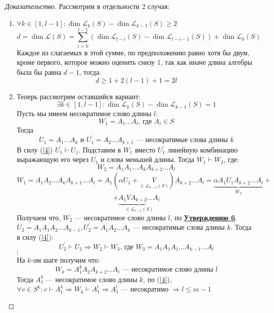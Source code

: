 \documentclass[a4paper, 14pt]{extarticle}
\theoremstyle{definition}
\begin{document}
\begin{proof}[Доказательство]
	Рассмотрим в отдельности 2 случая:
	\begin{enumerate}
		\item \(\forall k \in [1, l - 1] : \operatorname{dim} \mathcal{L}_k(S) - \operatorname{dim} \mathcal{L}_{k - 1}(S) \geqslant 2\)
		\[d = \operatorname{dim} \mathcal{L}(S) = \sum\limits_{i = 0}^{l - 1} \left(\operatorname{dim} \mathcal{L}_{l - i}(S) - \operatorname{dim} \mathcal{L}_{l - i - 1}(S) \right) + \operatorname{dim} \mathcal{L}_{0}(S)\]
		Каждое из слагаемых в этой сумме, по предположению равно хотя бы двум, кроме первого, которое можно оценить снизу 1, так как иначе длина алгебры была бы равна \(d - 1\), тогда:
		\[d \geqslant 1 + 2(l - 1) + 1 = 2l\]
		
		\item Теперь рассмотрим оставшийся вариант:
		\[\exists k \in [1, l - 1] : \operatorname{dim} \mathcal{L}_k(S) - \operatorname{dim} \mathcal{L}_{k - 1}(S) = 1 \label{4}\tag{4}\]
		Пусть мы имеем несократимое слово длины \(l\):
		\[W_1 = A_1 \dots A_l \text{, где } A_i \in S\]
		Тогда
		\[U_1 = A_1 \dots A_k \text{ и } U^{\prime}_1 = A_2 \dots A_{k + 1} \text{ --- несократимые слова длины } k\]
		В силу (\ref{4}) \(U_1^{\prime} \vdash U_1\). Подставим в \(W_1\) вместо \(U_1^{\prime}\) линейную комбинацию выражающую его через \(U_1\) и слова меньшей длины. Тогда \(W_1 \vdash W_2\), где:
		\[W_2 = A_1A_1 \dots A_k A_{k + 2} \dots A_l\]
		\[W_1 = A_1A_2 \dots A_{k}A_{k + 1} \dots A_l = A_1 (\alpha U_1 + \underset{\in \mathcal{L}_{k - 1}(S)}{V})A_{k + 2} \dots A_l = \underbrace{\alpha A_1 U_1 A_{k + 2} \dots A_l}_{W_2} +\]
		\[+ \underbrace{A_1 V A_{k + 2} \dots A_{l}}_{\in \mathcal{L}_{l - 1}(S)}\]
		Получаем что, \(W_2\) --- несократимое слово длины \(l\), по \hyperref[st7_2]{\textbf{Утверждению 6}}.\\
		\(U_2 = A_1A_1A_2 \dots A_{k - 1}, U_2^{\prime} = A_1A_2 \dots A_{k}\) --- несократимые слова длины \(k\). Тогда в силу (\ref{4}):
		\[U_2^{\prime} \vdash U_2 \Rightarrow W_2 \vdash W_3 \text{, где } W_3 = A_1A_1A_1 \dots A_{k - 1} \dots A_{l}\]
		\(\vdots\)\\
		На \(k\)-ом шаге получим что:
		\[W_k = A_1^k A_2 A_{k + 2} \dots A_l \text{ --- несократимое слово длины } l\]
		Тогда \(A_1^k\) --- несократимое слово длины \(k\), по (\ref{4}), \(\forall v \in S^k : v \vdash A_1^k \Rightarrow W_k \vdash A^{l}_1 \Rightarrow A_1^l\) --- несократимо \(\Rightarrow l \leqslant m - 1\)
	\end{enumerate}
\end{proof}
\end{document}

